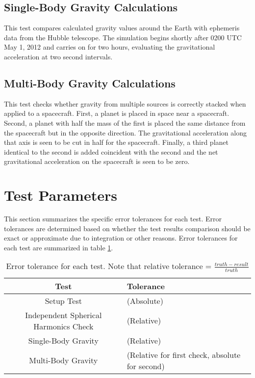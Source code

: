 \subsection{Single-Body Gravity Calculations} This test compares calculated gravity values around the Earth with ephemeris data from the Hubble telescope. The simulation begins shortly after 0200 UTC May 1, 2012 and carries on for two hours, evaluating the gravitational acceleration at two  second intervals.
\subsection{Multi-Body Gravity Calculations} This test checks whether gravity from multiple sources is correctly stacked when applied to a spacecraft. First, a planet is placed in space near a spacecraft. Second, a planet with half the mass of the first is placed the same distance from the spacecraft but in the opposite direction. The gravitational acceleration along that axis is seen to be cut in half for the spacecraft. Finally, a third planet identical to the second is added coincident with the second and the net gravitational acceleration on the spacecraft is seen to be zero. 

\section{Test Parameters}

This section summarizes the  specific error tolerances for each test. Error tolerances are determined based on whether the test results comparison should be exact or approximate due to integration or other reasons. Error tolerances for each test are summarized in table \ref{tab:errortol}. \\

\begin{table}[htbp]
	\caption{Error tolerance for each test. Note that relative tolerance = $\frac{truth - result}{truth}$}
	\label{tab:errortol}
	\centering \fontsize{10}{10}\selectfont
	\begin{tabular}{ c |  l } %
		\hline
		\textbf{Test}   							    & \textbf{Tolerance} 						  \\ \hline
		Setup Test                           			 & 	(Absolute)	   \\ 
		Independent Spherical Harmonics Check  & 	(Relative)	   \\ 
		Single-Body Gravity						   & 						(Relative)								   \\ 
		Multi-Body Gravity 						   & 	 (Relative for first check, absolute for second)		       \\ \hline
	\end{tabular}
\end{table}

